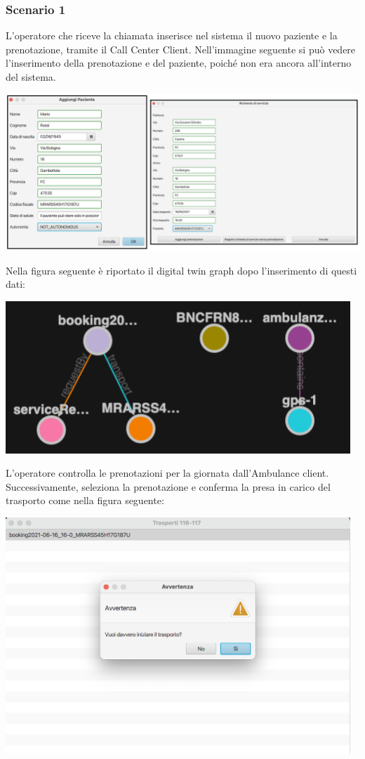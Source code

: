 \documentclass[12pt]{article}
\begin{document}
\subsubsection{Scenario 1}
L'operatore che riceve la chiamata inserisce nel sistema il nuovo paziente e la prenotazione, tramite il Call Center Client. Nell'immagine seguente si può vedere l'inserimento della prenotazione e del paziente, poiché non era ancora all'interno del sistema. 

\hfill \break

\centerline{
\includegraphics[width=15cm]{fig/Prenotazione.png}}
\hfill \break


Nella figura seguente è riportato il digital twin graph dopo l'inserimento di questi dati:
\hfill \break

\centerline{
\includegraphics[width=13cm]{fig/scenario1-prenotazione.png}}
\hfill \break

 L'operatore controlla le prenotazioni per la giornata dall'Ambulance client.
 Successivamente, seleziona la prenotazione e conferma la presa in carico del trasporto come nella figura seguente:
 \hfill \break

\centerline{
 \includegraphics[width=13cm]{fig/prenotazioni.png}}
\hfill \break
\end{document}
